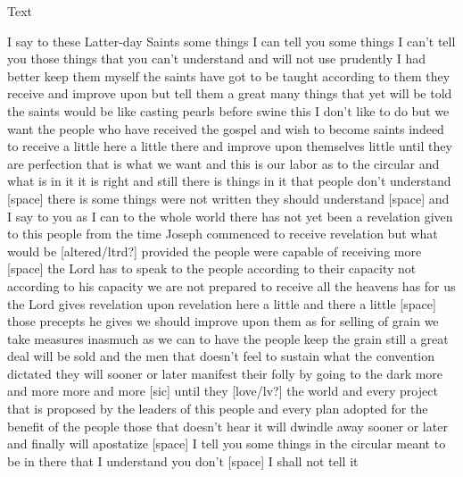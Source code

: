				\begin{description}
					\item[Text]
				\end{description}
					
					I say to these Latter-day Saints some things I can tell you some things I can't tell you those things that you can't understand and will not use prudently I had better keep them myself the saints have got to be taught according to them they receive and improve upon but tell them a great many things that yet will be told the saints would be like casting pearls before swine this I don't like to do but we want the people who have received the gospel and wish to become saints indeed to receive a little here a little there and improve upon themselves little until they are perfection that is what we want and this is our labor as to the circular and what is in it it is right and still there is things in it that people don't understand [space] there is some things were not written they should understand [space] and I say to you as I can to the whole world there has not yet been a revelation given to this people from the time Joseph commenced to receive revelation but what would be [altered/ltrd?] provided the people were capable of receiving more [space] the Lord has to speak to the people according to their capacity not according to his capacity we are not prepared to receive all the heavens has for us the Lord gives revelation upon revelation here a little and there a little [space] those precepts he gives we should improve upon them as for selling of grain we take measures inasmuch as we can to have the people keep the grain still a great deal will be sold and the men that doesn't feel to sustain what the convention dictated they will sooner or later manifest their folly by going to the dark more and more more and more [sic] until they [love/lv?] the world and every project that is proposed by the leaders of this people and every plan adopted for the benefit of the people those that doesn't hear it will dwindle away sooner or later and finally will apostatize [space] I tell you some things in the circular meant to be in there that I understand you don't [space] I shall not tell it
			
\pagebreak{}
